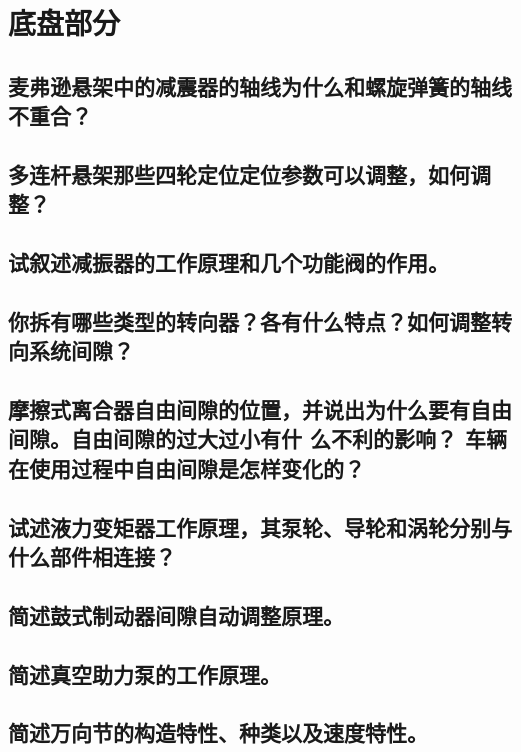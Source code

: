 \documentclass[UTF8]{ctexart}
\numberwithin{figure}{section}
\numberwithin{table}{section}
\begin{document}
\section{底盘部分}
\subsection{麦弗逊悬架中的减震器的轴线为什么和螺旋弹簧的轴线不重合？}
\subsection{多连杆悬架那些四轮定位定位参数可以调整，如何调整？}
\subsection{试叙述减振器的工作原理和几个功能阀的作用。}
\subsection{你拆有哪些类型的转向器？各有什么特点？如何调整转向系统间隙？}
\subsection{摩擦式离合器自由间隙的位置，并说出为什么要有自由间隙。自由间隙的过大过小有什
	么不利的影响？ 车辆在使用过程中自由间隙是怎样变化的？}
\subsection{试述液力变矩器工作原理，其泵轮、导轮和涡轮分别与什么部件相连接？}
\subsection{简述鼓式制动器间隙自动调整原理。}
\subsection{简述真空助力泵的工作原理。}
\subsection{简述万向节的构造特性、种类以及速度特性。}
\newpage
\end{document}
